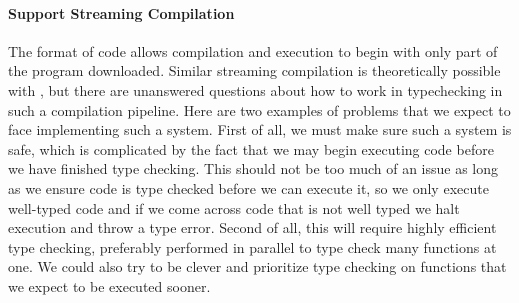 \paragraph{Support Streaming Compilation}
The format of \wasm code allows compilation and execution to begin with only part of the program downloaded.
Similar streaming compilation is theoretically possible with \name, but there are unanswered questions about how to work in typechecking in such a compilation pipeline.
Here are two examples of problems that we expect to face implementing such a system.
First of all, we must make sure such a system is safe, which is complicated by the fact that we may begin executing code before we have finished type checking.
This should not be too much of an issue as long as we ensure code is type checked before we can execute it, so we only execute well-typed code and if we come across code that is not well typed we halt execution and throw a type error.
Second of all, this will require highly efficient type checking, preferably performed in parallel to type check many functions at one.
We could also try to be clever and prioritize type checking on functions that we expect to be executed sooner.
